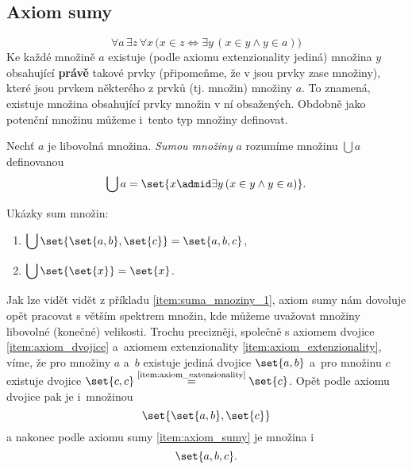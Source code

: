 \subsection{Axiom sumy}
\begin{equation*}
    \forall a\,\exists z\,\forall x\,\bigl(x\in z\iff \exists y\,(x\in y \land y\in a)\bigr)
\end{equation*}
Ke každé množině $a$ existuje (podle axiomu extenzionality jediná) množina $y$ obsahující \textbf{právě} takové prvky (připomeňme, že v \ZF{} jsou prvky zase množiny), které jsou prvkem některého z prvků (tj. množin) množiny $a$. To znamená, existuje množina obsahující prvky množin v ní obsažených. Obdobně jako potenční množinu můžeme i~tento typ množiny definovat.
\begin{definition}
    Nechť $a$ je libovolná množina. \emph{Sumou množiny} $a$ rozumíme množinu $\bigcup a$ definovanou
    \begin{equation*}
        \bigcup a=\set{x \admid \exists y\,(x\in y \land y\in a)}.
    \end{equation*}
\end{definition}
\begin{example}\label{ex:sumy_mnozin}
    Ukázky sum množin:
    \begin{enumerate}[label=(\roman*)]
        \item\label{item:suma_mnoziny_1} $\displaystyle\bigcup\set{\set{a,b},\set{c}}=\set{a,b,c}$,
        \item\label{item:suma_mnoziny_2} $\displaystyle\bigcup\set{\set{x}}=\set{x}$.
    \end{enumerate}
\end{example}
Jak lze vidět vidět z příkladu \ref{item:suma_mnoziny_1}, axiom sumy nám dovoluje opět pracovat s větším spektrem množin, kde můžeme uvažovat množiny libovolné (konečné) velikosti. Trochu precizněji, společně s axiomem dvojice \ref{item:axiom_dvojice} a~axiomem extenzionality \ref{item:axiom_extenzionality}, víme, že pro množiny $a$ a~$b$ existuje jediná dvojice $\set{a,b}$ a~pro množinu $c$ existuje dvojice $\set{c,c}\stackrel{\text{\ref{item:axiom_extenzionality}}}{=}\set{c}$. Opět podle axiomu dvojice pak je i~množinou
\begin{equation*}
    \set{\set{a,b},\set{c}}
\end{equation*}
a nakonec podle axiomu sumy \ref{item:axiom_sumy} je množina i
\begin{equation*}
    \set{a,b,c}.
\end{equation*}
\medskip

